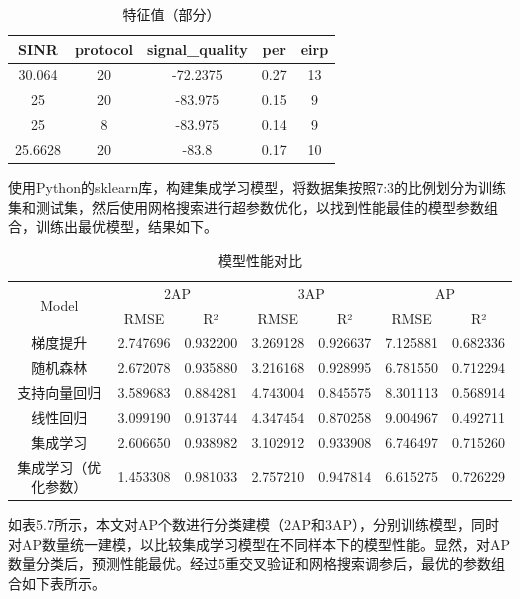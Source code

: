 \documentclass[bwprint]{gmcmthesis}
\begin{document}
\begin{table}[H]
	\centering
	\caption{特征值（部分）}
	\begin{tabular}{ccccc} %
		\toprule
		SINR & protocol & signal\_quality &  per & eirp\\ 
		\midrule
		 30.064 & 20 & -72.2375 &  0.27 & 13 \\
		 25 & 20 & -83.975 &  0.15 & 9 \\
	 	 25 & 8 & -83.975 &  0.14 & 9 \\
		 25.6628 & 20 & -83.8 &  0.17 & 10 \\
		\bottomrule
	\end{tabular}
\end{table}

使用Python的sklearn库，构建集成学习模型，将数据集按照7:3的比例划分为训练集和测试集，然后使用网格搜索进行超参数优化，以找到性能最佳的模型参数组合，训练出最优模型，结果如下。


\begin{table}[H]
	\centering
	\caption{模型性能对比}
	\begin{tabular}{@{}ccccccc@{}}
		\toprule
		\multirow{2}{*}{Model} & \multicolumn{2}{c}{2AP} & \multicolumn{2}{c}{3AP} & \multicolumn{2}{c}{AP} \\ 
		\cmidrule{2-3}
		\cmidrule{4-5}
		\cmidrule{6-7}
		& RMSE & R² & RMSE & R² & RMSE & R² \\ 
		\midrule
		梯度提升 & 2.747696 & 0.932200 & 3.269128 & 0.926637 & 7.125881 & 0.682336 \\
		随机森林 & 2.672078 & 0.935880 & 3.216168 & 0.928995 & 6.781550 & 0.712294 \\
		支持向量回归 & 3.589683 & 0.884281 & 4.743004 & 0.845575 & 8.301113 & 0.568914 \\
		线性回归 & 3.099190 & 0.913744 & 4.347454 & 0.870258 & 9.004967 & 0.492711 \\
		集成学习 & 2.606650 & 0.938982 & 3.102912 & 0.933908 & 6.746497 & 0.715260 \\
		集成学习（优化参数） & 1.453308 & 0.981033 & 2.757210 & 0.947814 & 6.615275 & 0.726229 \\ 
		\bottomrule
	\end{tabular}
\end{table}










如表5.7所示，本文对AP个数进行分类建模（2AP和3AP），分别训练模型，同时对AP数量统一建模，以比较集成学习模型在不同样本下的模型性能。显然，对AP数量分类后，预测性能最优。经过5重交叉验证和网格搜索调参后，最优的参数组合如下表所示。
\end{document}

